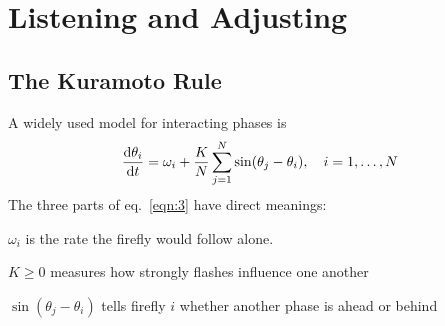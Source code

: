 \section{Listening and Adjusting}
\subsection{The Kuramoto Rule}
A widely used model for interacting phases is
\begin{equation}
    \frac{\mathrm{d}\theta_{i}}{\mathrm{d}t} = \omega_{i} + \frac{K}{N} \sum_{j=1}^{N} \sin(\theta_{j} - \theta_{i}), \quad i = 1, \dots , N
    \label{eqn:3}
\end{equation}
The three parts of eq.~\ref{eqn:3} have direct meanings:
\begin{description}[style=nextline]
    \item[Internal clock] $\omega_{i}$ 
is the rate the firefly would follow alone.
    \item[Coupling strength] $K\ge 0$ measures how strongly flashes influence one another
    \item[Timing correction] $\sin(\theta_{j} - \theta_{i})$ tells firefly $i$ whether another phase is ahead or behind
\end{description}






